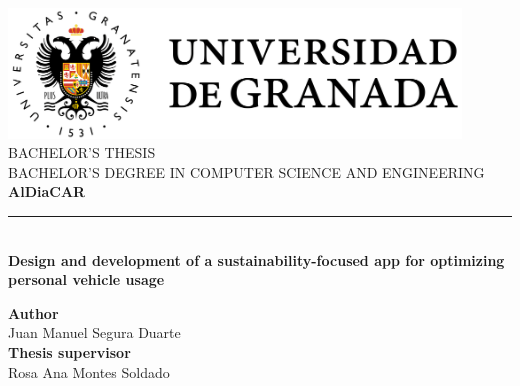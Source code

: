 \begin{titlepage}

  \newlength{\centeroffset}
  \setlength{\centeroffset}{-0.5\oddsidemargin}
  \addtolength{\centeroffset}{0.5\evensidemargin}
  \thispagestyle{empty}

  \noindent\hspace*{\centeroffset}
  \begin{minipage}{\textwidth}
    \centering

    \includegraphics[width=0.9\textwidth]{images/ugr-full.png} \\[1em]

    \textsc{\Large BACHELOR'S THESIS} \\[0.2cm]
    \textsc{BACHELOR'S DEGREE IN COMPUTER SCIENCE AND ENGINEERING} \\[1cm]

    {\Huge\bfseries AlDiaCAR} \\

    \noindent\rule[-1ex]{\textwidth}{2pt} \\[3.5ex]

    {\large\bfseries Design and development of a sustainability-focused app for optimizing personal vehicle usage}
  \end{minipage}

  \vspace{2.5cm}
  \noindent\hspace*{\centeroffset}

  \begin{minipage}{\textwidth}
    \centering

    \textbf{Author} \\[0.1em]
    \textnormal{Juan Manuel Segura Duarte} \\[2.5ex]

    \textbf{Thesis supervisor} \\[0.1em]
    \textnormal{Rosa Ana Montes Soldado} \\[2cm]


\end{minipage}
\end{titlepage}
